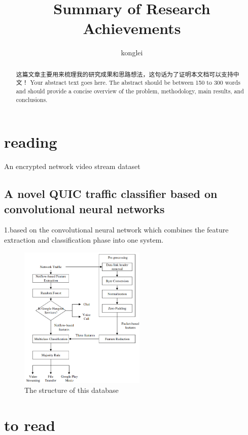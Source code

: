 \documentclass[a4paper, 10pt]{article}
\date{}
\title{
	Summary of Research Achievements %
}
\author[1,*]{konglei}
\affil[1]{Computer Science and Technology, Zhejiang University, Hangzhou, China}
\begin{document}
\maketitle %
\begin{abstract}
	这篇文章主要用来梳理我的研究成果和思路想法，这句话为了证明本文档可以支持中文！ %
	Your abstract text goes here. The abstract should be between 150 to 300 words and should provide a concise overview of the problem, methodology, main results, and conclusions.
\end{abstract}


\section{reading}
An encrypted network video stream dataset

\subsection{A novel QUIC traffic classifier based on convolutional neural networks}

1.based on the convolutional neural network which combines the feature extraction and classification phase into one system.
\begin{figure}[ht]
	\centering
	\begin{minipage}{0.5\textwidth}%
		\includegraphics[width=6cm]{1205.jpg}
		\caption{The structure of this database}
		\label{fig:cnn}
	\end{minipage}
\end{figure}






\section{to read}
\end{document}
